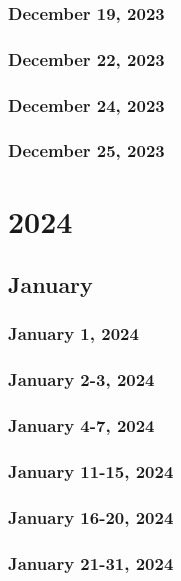 \section{December 19, 2023}

\section{December 22, 2023}

\section{December 24, 2023}

\section{December 25, 2023}


\part{2024}
\chapter{January}
\section{January 1, 2024}

\section{January 2-3, 2024}

\section{January 4-7, 2024}

\section{January 11-15, 2024}

\section{January 16-20, 2024}

\section{January 21-31, 2024}


